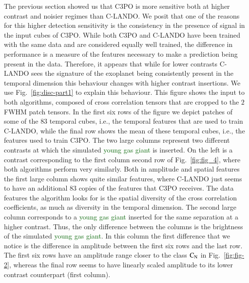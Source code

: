 \documentclass{aa}
\newcommand{\newchange}[1]{\textcolor{darkgreen}{#1}}
\begin{document}
The previous section showed us that C3PO is more sensitive both at higher contrast and noisier regimes than C-LANDO.
We posit that one of the reasons for this higher detection sensitivity is the consistency in the presence of signal in the input cubes of C3PO.
While both C3PO and C-LANDO have been trained with the same data and are considered equally well trained, the difference in performance is a measure of the features necessary to make a prediction being present in the data.
Therefore, it appears that while for lower contrasts C-LANDO sees the signature of the exoplanet being consistently present in the temporal dimension this behaviour changes with higher contrast insertions.
We use Fig.~\ref{fig:disc-part1} to explain this behaviour.
This figure shows the input to both algorithms, composed of cross correlation tensors that are cropped to the $2$ FWHM patch tensors.
In the first six rows of the figure we depict patches of some of the $83$ temporal cubes, i.e., the temporal features that are used to train C-LANDO, while the final row shows the mean of these temporal cubes, i.e., the features used to train C3PO.
The two large columns represent two different contrasts at which the simulated \newchange{young gas giant} is inserted. On the left is a contrast corresponding to the first column second row of Fig.~\ref{fig:fig_4}, where both algorithms perform very similarly.
Both in amplitude and spatial features the first large column shows quite similar features, where C-LANDO just seems to have an additional $83$ copies of the features that C3PO receives. 
The data features the algorithm looks for is the spatial diversity of the cross correlation coefficients, as much as diversity in the temporal dimension.
The second large column corresponds to a \newchange{young gas giant} inserted for the same separation at a higher contrast.
Thus, the only difference between the columns is the brightness of the simulated \newchange{young gas giant}.
In this column the first difference that we notice is the difference in amplitude between the first six rows and the last row.
The first six rows have an amplitude range closer to the class $\rm{C_N}$ in Fig.~\ref{fig:fig-2}, whereas the final row seems to have linearly scaled amplitude to its lower contrast counterpart (first column).
\end{document}
